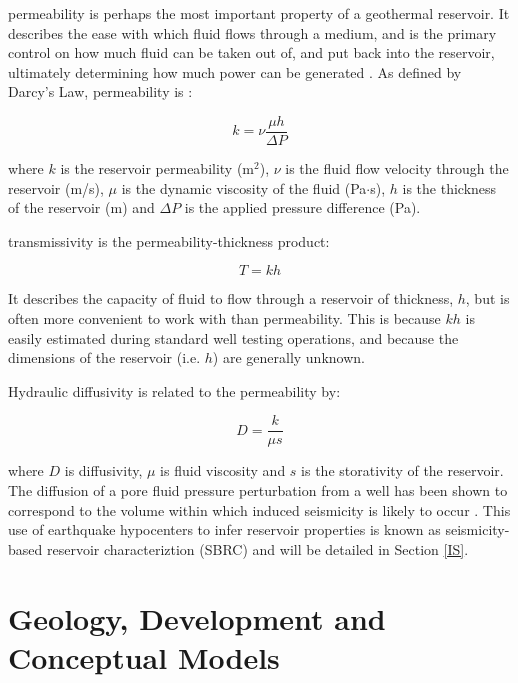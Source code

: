 \Gls{permeability} is perhaps the most important property of a geothermal reservoir. It describes the ease with which fluid flows through a medium, and is the primary control on how much fluid can be taken out of, and put back into the reservoir, ultimately determining how much power can be generated \citep{Grant_2011}. As defined by Darcy's Law, \gls{permeability} is \citep{DiPippo_2016}:

\begin{equation}
k = \nu\frac{\mu{h}}{\Delta{P}}
\end{equation}

where $k$ is the reservoir permeability (m$^2$), $\nu$ is the fluid flow velocity through the reservoir (m/s), $\mu$ is the dynamic viscosity of the fluid (Pa$\cdot$s), $h$ is the thickness of the reservoir (m) and $\Delta{P}$ is the applied pressure difference (Pa).

\Gls{transmissivity} is the permeability-thickness product:

\begin{equation}
T = kh
\end{equation}

It describes the capacity of fluid to flow through a reservoir of thickness, $h$, but is often more convenient to work with than permeability. This is because $kh$ is easily estimated during standard well testing operations, and because the dimensions of the reservoir (i.e. $h$) are generally unknown.

Hydraulic \gls{diffusivity} is related to the permeability by:

\begin{equation}
D = \frac{k}{\mu{s}}
\end{equation}

where $D$ is \gls{diffusivity}, $\mu$ is fluid viscosity and $s$ is the storativity of the reservoir. The diffusion of a pore fluid pressure perturbation from a well has been shown to correspond to the volume within which induced seismicity is likely to occur \citep[e.g.][]{Shapiro_2002,Parotidis_2004,Shapiro_2009,Shapiro_1997,Jeanne_2014}. This use of earthquake hypocenters to infer reservoir properties is known as seismicity-based reservoir characteriztion (SBRC) \citep{Shapiro_2002} and will be detailed in Section \ref{IS}.

\section{Geology, Development and Conceptual Models}
